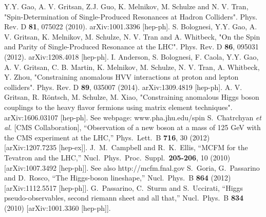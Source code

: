 \documentclass[aps,superscriptaddress,nofootinbib]{revtex4}
\begin{document}
\begin{thebibliography}{99}
Y.Y. Gao, A. V. Gritsan, Z.J. Guo, K. Melnikov, M. Schulze and N. V. Tran, "Spin-Determination of Single-Produced Resonances at Hadron Colliders". Phys. Rev. D {\bf 81}, 075022 (2010). arXiv:1001.3396 [hep-ph].
S. Bolognesi, Y.Y. Gao, A. V. Gritsan, K. Melnikov, M. Schulze, N. V. Tran and A. Whitbeck, "On the Spin and Parity of Single-Produced Resonance at the LHC". Phys. Rev. D {\bf 86}, 095031 (2012). arXiv:1208.4018 [hep-ph].
I. Anderson, S. Bolognesi, F. Caola, Y.Y. Gao, A. V. Gritsan, C. B. Martin, K. Melnikov, M. Schulze, N. V. Tran, A. Whitbeck, Y. Zhou, "Constraining anomalous HVV interactions at proton and lepton colliders". Phys. Rev. D {\bf 89}, 035007 (2014). arXiv:1309.4819 [hep-ph].
A. V. Gritsan, R. R\"ontsch, M. Schulze, M. Xiao, "Constraining anomalous Higgs boson couplings to the heavy flavor fermions using matrix element techniques". arXiv:1606.03107 [hep-ph].
See webpage: www.pha.jhu.edu/spin
  S.~Chatrchyan {\it et al.}  [CMS Collaboration],
  ``Observation of a new boson at a mass of 125 GeV with the CMS experiment at the LHC,''
  Phys.\ Lett.\ B {\bf 716}, 30 (2012)
  [arXiv:1207.7235 [hep-ex]].
  J.~M.~Campbell and R.~K.~Ellis,
  ``MCFM for the Tevatron and the LHC,''
  Nucl.\ Phys.\ Proc.\ Suppl.\  {\bf 205-206}, 10 (2010)
  [arXiv:1007.3492 [hep-ph]].
  See also http://mcfm.fnal.gov
  S.~Goria, G.~Passarino and D.~Rosco,
  ``The Higgs-boson lineshape,''
  Nucl.\ Phys.\ B  {\bf 864} (2012)
  [arXiv:1112.5517 [hep-ph]].
  G.~Passarino, C.~Sturm and S.~Uccirati, 
  ``Higgs pseudo-observables, second riemann sheet and all that,''
  Nucl.\ Phys.\ B {\bf 834} (2010)
  [arXiv:1001.3360 [hep-ph]].

\end{thebibliography}
\end{document}
